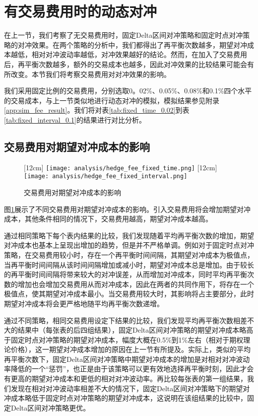 \section{有交易费用时的动态对冲}

在上一节，我们考察了无交易费用时，固定Delta区间对冲策略和固定时点对冲策略的对冲效果。在两个策略的分析中，我们都得出了再平衡次数越多，期望对冲成本越低，相对对冲波动率越低，对冲效果越好的结论。然而，在加入了交易费用后，再平衡次数越多，额外的交易成本也越多，因此对冲效果的比较结果可能会有所改变。本节我们将考察交易费用对对冲效果的影响。

我们采用固定比例的交易费用，分别选取0。02\%、0.05\%、0.08\%和0.1\%四个水平的交易成本，与上一节类似地进行动态对冲的模拟，模拟结果参见附录\ref{app:sim_fee_result}。我们将对表\ref{tab:fixed_time_0.02}到表\ref{tab:fixed_interval_0.1}的结果进行对比分析。

\subsection{交易费用对期望对冲成本的影响}

\begin{figure}[htb]
  \centering
  [12cm]
    {\texttt{[image: analysis/hedge\_fee\_fixed\_time.png]}}
  \hspace{0.5cm}
  [12cm]
    {\texttt{[image: analysis/hedge\_fee\_fixed\_interval.png]}}
    \caption[这里将出现在插图索引中]
    {交易费用对期望对冲成本的影响}
  \label{fig:hedge_fee}
\end{figure}

图\ref{fig:hedge_fee}展示了不同交易费用对期望对冲成本的影响。引入交易费用将会增加期望对冲成本，其他条件相同的情况下，交易费用越高，期望对冲成本越高。

通过相同策略下每个表内结果的比较，我们发现随着平均再平衡次数的增加，期望对冲成本也基本上呈现出增加的趋势，但是并不严格单调。例如对于固定时点对冲策略，在交易费用较小时，存在一个再平衡时间间隔，其期望对冲成本为极值点，当再平衡时间间隔从该时间间隔增加或减小时，期望对冲成本总是增加。由于较长的再平衡时间间隔将带来较大的对冲误差，从而增加对冲成本，同时平均再平衡次数的增加也会增加交易费用从而对冲成本，因此在两者的共同作用下，将存在一个极值点，使其期望对冲成本最小。当交易费用较大时，其影响将占主要部分，此时期望对冲成本将会更严格地随平均再平衡次数递增。

通过不同策略，相同交易费用设定下结果的比较，我们发现平均再平衡次数相差不大的结果中（每张表的后四组结果），固定Delta区间对冲策略的期望对冲成本略高于固定时点对冲策略的期望对冲成本，幅度大概在0.5\%到1\%左右（相对于期权理论价格），这一期望对冲成本增加的原因在上一节有所提及。实际上，类似的平均再平衡次数下，固定Delta区间对冲策略中期望对冲成本的增加是对相对对冲波动率降低的一个“惩罚”，也正是由于该策略可以更有效地选择再平衡时刻，因此才会有更高的期望对冲成本和更低的相对对冲波动率。再比较每张表的第一组结果，我们发现在相对对冲波动率相差不大的情况下，固定Delta区间对冲策略下的期望对冲成本略低于固定时点对冲策略的期望对冲成本，这说明在该组结果的比较中，固定Delta区间对冲策略更优。

